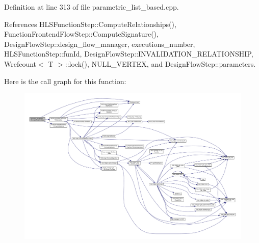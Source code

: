 Definition at line 313 of file parametric\+\_\+list\+\_\+based.\+cpp.



References H\+L\+S\+Function\+Step\+::\+Compute\+Relationships(), Function\+Frontend\+Flow\+Step\+::\+Compute\+Signature(), Design\+Flow\+Step\+::design\+\_\+flow\+\_\+manager, executions\+\_\+number, H\+L\+S\+Function\+Step\+::fun\+Id, Design\+Flow\+Step\+::\+I\+N\+V\+A\+L\+I\+D\+A\+T\+I\+O\+N\+\_\+\+R\+E\+L\+A\+T\+I\+O\+N\+S\+H\+IP, Wrefcount$<$ T $>$\+::lock(), N\+U\+L\+L\+\_\+\+V\+E\+R\+T\+EX, and Design\+Flow\+Step\+::parameters.

Here is the call graph for this function\+:
\nopagebreak
\begin{figure}[H]
\begin{center}
\leavevmode
\includegraphics[width=350pt]{d7/d47/classparametric__list__based_af4154cabe85bbd707fc5ee05981e54b0_cgraph}
\end{center}
\end{figure}
\mbox{\label{classparametric__list__based_a578ba2b5ccd255dc25d53274d3e301bc}} 
